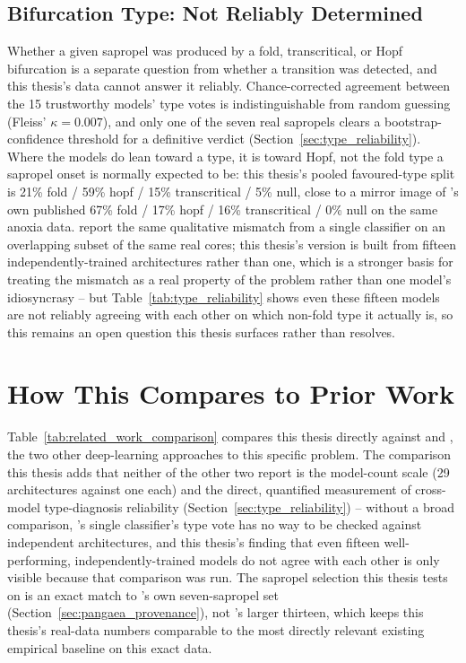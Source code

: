 \subsection{Bifurcation Type: Not Reliably Determined}
Whether a given sapropel was produced by a fold, transcritical, or Hopf bifurcation is a separate question from whether a transition was detected, and this thesis's data cannot answer it reliably. Chance-corrected agreement between the 15 trustworthy models' type votes is indistinguishable from random guessing (Fleiss' $\kappa = 0.007$), and only one of the seven real sapropels clears a bootstrap-confidence threshold for a definitive verdict (Section~\ref{sec:type_reliability}). Where the models do lean toward a type, it is toward Hopf, not the fold type a sapropel onset is normally expected to be: this thesis's pooled favoured-type split is 21\% fold / 59\% hopf / 15\% transcritical / 5\% null, close to a mirror image of \citet{bury2021}'s own published 67\% fold / 17\% hopf / 16\% transcritical / 0\% null on the same anoxia data. \citet{babazadeh2025} report the same qualitative mismatch from a single classifier on an overlapping subset of the same real cores; this thesis's version is built from fifteen independently-trained architectures rather than one, which is a stronger basis for treating the mismatch as a real property of the problem rather than one model's idiosyncrasy -- but Table~\ref{tab:type_reliability} shows even these fifteen models are not reliably agreeing with each other on which non-fold type it actually is, so this remains an open question this thesis surfaces rather than resolves.

\section{How This Compares to Prior Work}
Table~\ref{tab:related_work_comparison} compares this thesis directly against \citet{bury2021} and \citet{babazadeh2025}, the two other deep-learning approaches to this specific problem. The comparison this thesis adds that neither of the other two report is the model-count scale (29 architectures against one each) and the direct, quantified measurement of cross-model type-diagnosis reliability (Section~\ref{sec:type_reliability}) -- without a broad comparison, \citet{bury2021}'s single classifier's type vote has no way to be checked against independent architectures, and this thesis's finding that even fifteen well-performing, independently-trained models do not agree with each other is only visible because that comparison was run. The sapropel selection this thesis tests on is an exact match to \citet{ma2025sdml}'s own seven-sapropel set (Section~\ref{sec:pangaea_provenance}), not \citet{bury2021}'s larger thirteen, which keeps this thesis's real-data numbers comparable to the most directly relevant existing empirical baseline on this exact data.

